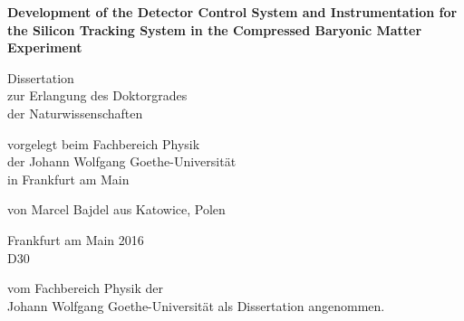 \documentclass{cd-cover}
\begin{document}
    \CDbookletTopMargin=0mm
    \CDbookletMargin=5mm
    \begin{bookletsheets}
        \vspace*{3mm}

        \begin{center} \sffamily\Large\bfseries
            Development of the Detector Control System and Instrumentation for the Silicon Tracking System in the Compressed Baryonic Matter Experiment
        \end{center}

        \vspace*{3mm}

        \begin{center} \sffamily\small
            Dissertation\\
            zur Erlangung des Doktorgrades\\
            der Naturwissenschaften
        \end{center}

        \vspace*{2mm}

        \begin{center} \sffamily\small
            vorgelegt beim Fachbereich Physik\\
            der Johann Wolfgang Goethe-Universit\"at\\
            in Frankfurt am Main
        \end{center}

        \vspace*{2mm}

        \begin{center} \sffamily\small
            von
            Marcel Bajdel
            aus Katowice, Polen
        \end{center}

        \vspace*{2mm}

        \begin{center} \sffamily\small
        Frankfurt am Main 2016\\
        D30
        \end{center}

        \vspace*{0.25\textheight}

        \noindent{}%
        vom Fachbereich Physik der \\[2pt]
        Johann Wolfgang Goethe-Universit\"at als Dissertation angenommen.

        \vspace*{2cm}


\end{bookletsheets}
\end{document}
